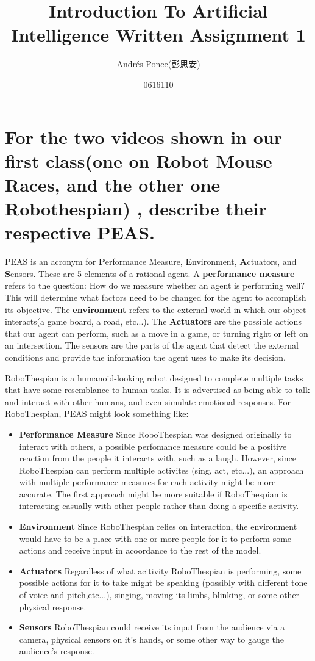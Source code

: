 \documentclass{article}
\title{Introduction To Artificial Intelligence Written Assignment 1}
\author{Andr\'es Ponce(彭思安) \\
\and
0616110}
\begin{document}
\maketitle
\section{For the two videos shown in our first class(one on Robot Mouse Races, and the other one Robothespian)
, describe their respective PEAS.}
PEAS is an acronym for \textbf{P}erformance Measure, \textbf{E}nvironment, \textbf{A}ctuators, and
\textbf{S}ensors. These are 5 elements of a rational agent. A \textbf{performance measure} 
refers to the question:
How do we measure whether an agent is performing well? This will determine what factors need to be changed
for the agent to accomplish its objective. The \textbf{environment} refers to the external world in which
our object interacts(a game board, a road, etc...). The \textbf{Actuators} are the possible actions that 
our agent can perform, such as a move in a game, or turning right or left on an intersection. The sensors
are the parts of the agent that detect the external conditions and provide the information the agent uses
to make its decision.

RoboThespian is a humanoid-looking robot designed to complete multiple tasks that have some resemblance to 
human tasks. It is advertised as being able to talk and interact with other humans, and even simulate 
emotional responses. For RoboThespian, PEAS might look something like:
\begin{itemize}
	\item \textbf{Performance Measure} Since RoboThespian was designed originally to interact with others,	
			a possible perfomance measure could be a positive reaction from the people it interacts with,
			such as a laugh. 
			However, since RoboThespian can perform multiple activites (sing, act, etc...), an approach with 
			multiple performance measures for each activity might be more accurate. The first approach might	
			be more suitable if RoboThespian is interacting casually with other people rather than doing a
			specific activity.
	\item \textbf{Environment} Since RoboThespian relies on interaction, the environment would have to be 
			a place with one or more people for it to perform some actions and receive input in acoordance 
			to the rest of the model.
	\item \textbf{Actuators} Regardless of what acitivity RoboThespian is performing, some possible 
			actions for it to take might be speaking (possibly with different tone of voice and pitch,etc...),
			singing, moving its limbs, blinking, or some other physical response.
	\item \textbf{Sensors} RoboThespian could receive its input from the audience via a camera, physical 
			sensors on it's hands, or some other way to gauge the audience's response.
\end{itemize}
\end{document}
